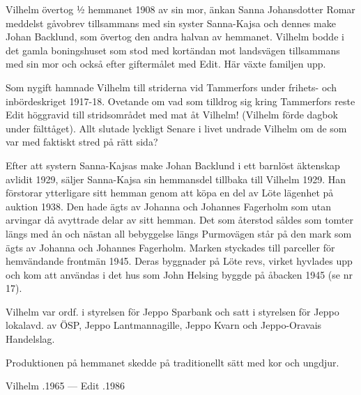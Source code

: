 Vilhelm  övertog  ½ hemmanet 1908 av sin mor, änkan Sanna Johansdotter Romar meddelst gåvobrev tillsammans med sin syster Sanna-Kajsa och dennes make Johan Backlund, som övertog den andra halvan av hemmanet. Vilhelm bodde i det  gamla boningshuset som stod med kortändan mot landsvägen tillsammans med sin mor och också efter giftermålet med Edit. Här växte familjen upp.

Som nygift hamnade Vilhelm till striderna vid Tammerfors under frihets- och inbördeskriget 1917-18. Ovetande om vad som tilldrog sig kring Tammerfors reste Edit höggravid till stridsområdet med mat åt Vilhelm! (Vilhelm förde dagbok under fälttåget). Allt slutade lyckligt Senare i livet undrade Vilhelm om de som var med faktiskt stred på rätt sida?

Efter att systern Sanna-Kajsas make Johan Backlund i ett barnlöst äktenskap avlidit 1929, säljer Sanna-Kajsa sin hemmansdel tillbaka till Vilhelm 1929. Han förstorar ytterligare sitt hemman genom att köpa en del av Löte lägenhet på auktion 1938. Den hade ägts av Johanna och Johannes Fagerholm som utan arvingar då  avyttrade  delar av sitt hemman. Det som återstod såldes som tomter längs med ån och nästan all bebyggelse längs Purmovägen står på den mark som ägts av Johanna och Johannes Fagerholm. Marken styckades till parceller för hemvändande frontmän 1945. Deras byggnader på Löte revs, virket hyvlades upp och kom att användas i det hus som John Helsing byggde på åbacken 1945 (se nr 17).

Vilhelm var ordf. i styrelsen för Jeppo Sparbank och satt i styrelsen för Jeppo lokalavd. av ÖSP, Jeppo Lantmannagille, Jeppo Kvarn och Jeppo-Oravais Handelslag.
\begin{jhchildren}
  \item {}
  \item {}
  \item {}
  \item {}
\end{jhchildren}
Produktionen på hemmanet skedde på traditionellt sätt med kor och ungdjur.

Vilhelm .1965  ---  Edit .1986


